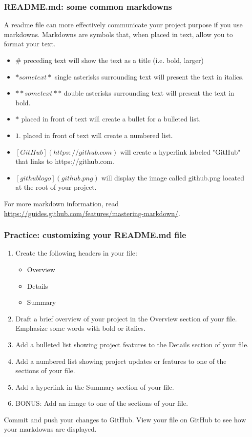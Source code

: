 \documentclass{beamer}
\begin{document}
\begin{frame}\frametitle{README.md: some common markdowns}
A readme file can more effectively communicate your project purpose if you use markdowns. Markdowns are symbols that, when placed in text, allow you to format your text.
\begin{itemize}
\item \# preceding text will show the text as a title (i.e. bold, larger)
\item $*some text*$ single asterisks surrounding text will present the text in italics.
\item $**some text**$ double asterisks surrounding text will present the text in bold.
\item $*$ placed in front of text will create a bullet for a bulleted list.
\item $1.$ placed in front of text will create a numbered list.
\item $[GitHub](https://github.com)$ will create a hyperlink labeled "GitHub" that links to https://github.com.
\item $[github logo](github.png)$ will display the image called github.png located at the root of your project.
\end{itemize}
For more markdown information, read \url{https://guides.github.com/features/mastering-markdown/}.
\end{frame}

\begin{frame}\frametitle{Practice: customizing your README.md file}
\begin{enumerate}
\item Create the following headers in your file:
\begin{itemize}
\item Overview
\item Details
\item Summary
\end{itemize}
\item Draft a brief overview of your project in the Overview section of your file. Emphasize some words with bold or italics.
\item Add a bulleted list showing project features to the Details section of your file.
\item Add a numbered list showing project updates or features to one of the sections of your file.
\item Add a hyperlink in the Summary section of your file.
\item BONUS: Add an image to one of the sections of your file.
\end{enumerate}
Commit and push your changes to GitHub. View your file on GitHub to see how your markdowns are displayed. 
\end{frame}
\end{document}
